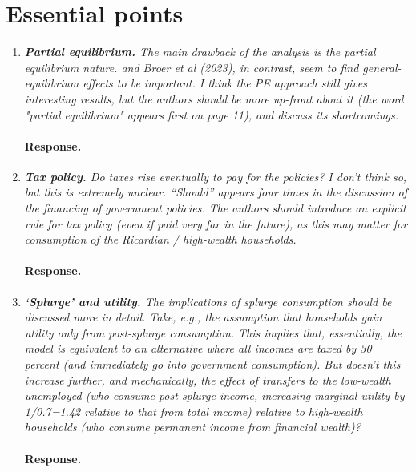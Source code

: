 \documentclass[12pt,letterpaper,english]{article}
\begin{document}
\section{Essential points}
\begin{enumerate}
	\item \textit{\textbf{Partial equilibrium.} The main drawback of the analysis is the partial equilibrium nature. \citet{kekre2022unemp} and Broer et al (2023), in contrast, seem to find general-equilibrium effects to be important. I think the PE approach still gives interesting results, but the authors should be more up-front about it (the word "partial equilibrium" appears first on page 11), and discuss its shortcomings.}
	
	\paragraph{Response.} 
	
	\item \textit{\textbf{Tax policy.} Do taxes rise eventually to pay for the policies? I don't think so, but this is extremely unclear. ``Should'' appears four times in the discussion of the financing of government policies. The authors should introduce an explicit rule for tax policy (even if paid very far in the future), as this may matter for consumption of the Ricardian / high-wealth households.}
	
	\paragraph{Response.} 
	
	\item \textit{\textbf{`Splurge' and utility.} The implications of splurge consumption should be discussed more in detail. Take, e.g., the assumption that households gain utility only from post-splurge consumption. This implies that, essentially, the model is equivalent to an alternative where all incomes are taxed by 30 percent (and immediately go into government consumption). But doesn't this increase further, and mechanically, the effect of transfers to the low-wealth unemployed (who consume post-splurge income, increasing marginal utility by 1/0.7=1.42 relative to that from total income) relative to high-wealth households (who consume permanent income from financial wealth)?}
		
	\paragraph{Response.} 


\end{enumerate}
\end{document}
